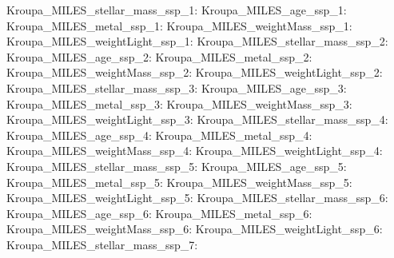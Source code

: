Kroupa\_MILES\_stellar\_mass\_ssp\_1:  \newline 
Kroupa\_MILES\_age\_ssp\_1:  \newline 
Kroupa\_MILES\_metal\_ssp\_1:  \newline 
Kroupa\_MILES\_weightMass\_ssp\_1:  \newline 
Kroupa\_MILES\_weightLight\_ssp\_1:  \newline 
Kroupa\_MILES\_stellar\_mass\_ssp\_2:  \newline 
Kroupa\_MILES\_age\_ssp\_2:  \newline 
Kroupa\_MILES\_metal\_ssp\_2:  \newline 
Kroupa\_MILES\_weightMass\_ssp\_2:  \newline 
Kroupa\_MILES\_weightLight\_ssp\_2:  \newline 
Kroupa\_MILES\_stellar\_mass\_ssp\_3:  \newline 
Kroupa\_MILES\_age\_ssp\_3:  \newline 
Kroupa\_MILES\_metal\_ssp\_3:  \newline 
Kroupa\_MILES\_weightMass\_ssp\_3:  \newline 
Kroupa\_MILES\_weightLight\_ssp\_3:  \newline 
Kroupa\_MILES\_stellar\_mass\_ssp\_4:  \newline 
Kroupa\_MILES\_age\_ssp\_4:  \newline 
Kroupa\_MILES\_metal\_ssp\_4:  \newline 
Kroupa\_MILES\_weightMass\_ssp\_4:  \newline 
Kroupa\_MILES\_weightLight\_ssp\_4:  \newline 
Kroupa\_MILES\_stellar\_mass\_ssp\_5:  \newline 
Kroupa\_MILES\_age\_ssp\_5:  \newline 
Kroupa\_MILES\_metal\_ssp\_5:  \newline 
Kroupa\_MILES\_weightMass\_ssp\_5:  \newline 
Kroupa\_MILES\_weightLight\_ssp\_5:  \newline 
Kroupa\_MILES\_stellar\_mass\_ssp\_6:  \newline 
Kroupa\_MILES\_age\_ssp\_6:  \newline 
Kroupa\_MILES\_metal\_ssp\_6:  \newline 
Kroupa\_MILES\_weightMass\_ssp\_6:  \newline 
Kroupa\_MILES\_weightLight\_ssp\_6:  \newline 
Kroupa\_MILES\_stellar\_mass\_ssp\_7:  \newline 
